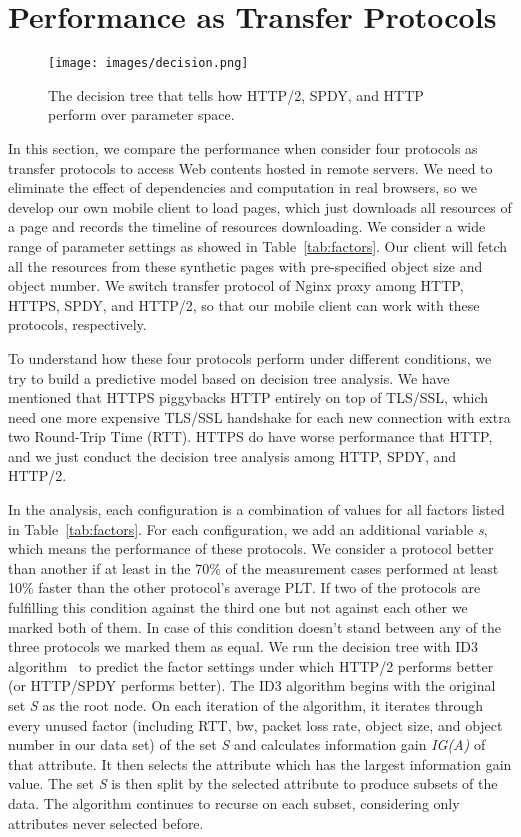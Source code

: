 \section{Performance as Transfer Protocols }
\begin{figure}[htbp]
    \texttt{[image: images/decision.png]}
    \caption{The decision tree that tells how HTTP/2, SPDY, and HTTP perform over parameter space.} \label{fig:decision_tree}
\end{figure}


In this section, we compare the performance when consider four protocols as transfer protocols to access Web contents hosted in remote servers. We need to eliminate the effect of dependencies and computation in real browsers, so we develop our own mobile client to load pages, which just downloads all resources of a page and records the timeline of resources downloading. We consider a wide range of parameter settings as showed in Table~\ref{tab:factors}. Our client will fetch all the resources from these synthetic pages with pre-specified object size and object number. We switch transfer protocol of Nginx proxy among HTTP, HTTPS, SPDY, and HTTP/2, so that our mobile client can work with these protocols, respectively. 

To understand how these four protocols perform under different conditions, we try to build a predictive model based on decision tree analysis. We have mentioned that HTTPS piggybacks HTTP entirely on top of TLS/SSL, which need one more expensive TLS/SSL handshake for each new connection with extra two Round-Trip Time (RTT). HTTPS do have worse performance that HTTP, and we just conduct the decision tree analysis among HTTP, SPDY, and HTTP/2.

In the analysis, each configuration is a combination of values for all factors listed in Table~\ref{tab:factors}. For each configuration, we add an additional variable \textit{s}, which means the performance of these protocols. We consider a protocol better than another if at least in the 70\% of the measurement cases performed at least 10\% faster than the other protocol’s average PLT. If two of the protocols are fulfilling this condition against the third one but not against each other we marked both of them. In case of this condition doesn’t stand between any of the three protocols we marked them as equal. We run the decision tree with ID3 algorithm~\cite{decisiontree} to predict the factor settings under which HTTP/2 performs better (or HTTP/SPDY performs better). The ID3 algorithm begins with the original set \textit{S} as the root node. On each iteration of the algorithm, it iterates through every unused factor (including RTT, bw, packet loss rate, object size, and object number in our data set) of the set \textit{S} and calculates information gain \textit{IG(A)} of that attribute. It then selects the attribute which has the largest information gain value. The set \textit{S} is then split by the selected attribute to produce subsets of the data. The algorithm continues to recurse on each subset, considering only attributes never selected before. 

